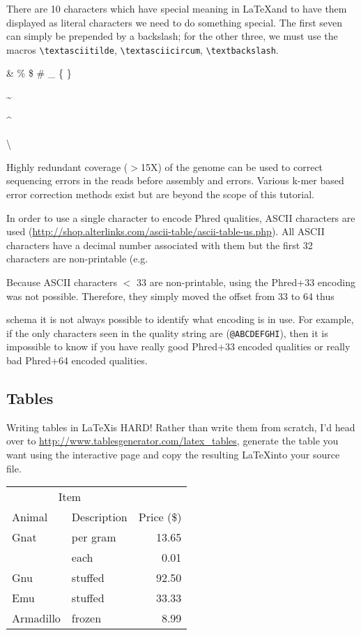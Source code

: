 There are 10 characters which have special meaning in \LaTeX and to have them displayed as literal
characters we need to do something special. The first seven can simply be prepended by a backslash;
for the other three, we must use the macros \verb+\textasciitilde+, \verb+\textasciicircum+,
\verb+\textbackslash+.


\& \% \$ \# \_ \{ \}

\textasciitilde

\textasciicircum

\textbackslash

Highly redundant coverage ($>$15X) of the genome can be used to correct sequencing
errors in the reads before assembly and errors. Various k-mer based error
correction methods exist but are beyond the scope of this tutorial.

In order to use a single character to encode Phred qualities, ASCII characters
are used (\url{http://shop.alterlinks.com/ascii-table/ascii-table-us.php}). All ASCII characters have a decimal
number associated with them but the first 32 characters are non-printable (e.g.

Because ASCII characters $<$ 33 are non-printable, using the Phred+33 encoding was
not possible. Therefore, they simply moved the offset from 33 to 64 thus

schema it is not always possible to identify what encoding is in use. For
example, if the only characters seen in the quality string are (\texttt{@ABCDEFGHI}),
then it is impossible to know if you have really good Phred+33 encoded qualities
or really bad Phred+64 encoded qualities.

\subsection{Tables}

Writing tables in \LaTeX is HARD! Rather than write them from scratch, I'd head over to
\url{http://www.tablesgenerator.com/latex_tables}, generate the table you want using the interactive
page and copy the resulting \LaTeX into your source file.

\begin{tabular}{llr}
\hline
\multicolumn{2}{c}{Item} \\
\cline{1-2}
Animal    & Description & Price (\$) \\
\hline
Gnat      & per gram    & 13.65      \\
          & each        & 0.01       \\
Gnu       & stuffed     & 92.50      \\
Emu       & stuffed     & 33.33      \\
Armadillo & frozen      & 8.99       \\
\hline
\end{tabular}

